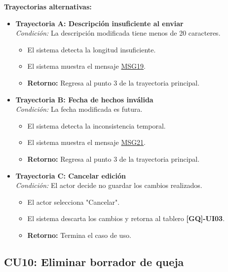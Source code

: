 \begin{appendices}
\textbf{Trayectorias alternativas:}
\begin{itemize}[leftmargin=*]
    \item \textbf{Trayectoria A: Descripción insuficiente al enviar} \\
    \textit{Condición:} La descripción modificada tiene menos de 20 caracteres.
    \begin{itemize}[nosep]
        \item[A-1:] El sistema detecta la longitud insuficiente.
        \item[A-2:] El sistema muestra el mensaje \hyperlink{msg:MSG19}{MSG19}.
        \item \textbf{Retorno:} Regresa al punto 3 de la trayectoria principal.
    \end{itemize}
    \item \textbf{Trayectoria B: Fecha de hechos inválida} \\
    \textit{Condición:} La fecha modificada es futura.
    \begin{itemize}[nosep]
        \item[B-1:] El sistema detecta la inconsistencia temporal.
        \item[B-2:] El sistema muestra el mensaje \hyperlink{msg:MSG21}{MSG21}.
        \item \textbf{Retorno:} Regresa al punto 3 de la trayectoria principal.
    \end{itemize}
    \item \textbf{Trayectoria C: Cancelar edición} \\
    \textit{Condición:} El actor decide no guardar los cambios realizados.
    \begin{itemize}[nosep]
        \item[C-1:] El actor selecciona "Cancelar".
        \item[C-2:] El sistema descarta los cambios y retorna al tablero \textbf{[GQ]-UI03}.
        \item \textbf{Retorno:} Termina el caso de uso.
    \end{itemize}
\end{itemize}

\newpage

\subsection{CU10: Eliminar borrador de queja}


\end{appendices}

